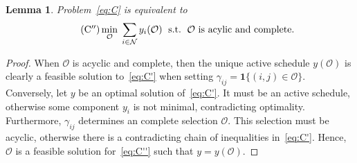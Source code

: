 \documentclass[a4paper]{report}
\theoremstyle{definition}
\theoremstyle{plain}
\newtheorem{lemma}{Lemma}[chapter]
\begin{document}
\begin{lemma}\label{lemma:disj-graph-optimization}
  Problem~\eqref{eq:C} is equivalent to
  \begin{align}
    \label{eq:C''}
    \tag{$\mathrm{C}^{\prime\prime}$}
    \min_{\mathcal{O}} \; \sum_{i \in \mathcal{N}} y_i(\mathcal{O}) \; \text{ s.t. } \, \mathcal{O} \text{ is acylic and complete. }
  \end{align}
\end{lemma}
\begin{proof}
  When $\mathcal{O}$ is acyclic and complete, then the unique active schedule
  $y(\mathcal{O})$ is clearly a feasible solution to~\eqref{eq:C'} when setting
  $\gamma_{ij} = \mathbf{1} \{ (i,j) \in \mathcal{O} \}$.
  Conversely, let $y$ be an optimal solution of~\eqref{eq:C'}. It must be an active
  schedule, otherwise some component $y_i$ is not minimal, contradicting
  optimality. Furthermore, $\gamma_{ij}$ determines an complete selection
  $\mathcal{O}$. This selection must be acyclic, otherwise there is a
  contradicting chain of inequalities in~\eqref{eq:C'}.
  Hence, $\mathcal{O}$ is a feasible solution
  for~\eqref{eq:C''} such that $y = y(\mathcal{O})$.
\end{proof}
\end{document}
